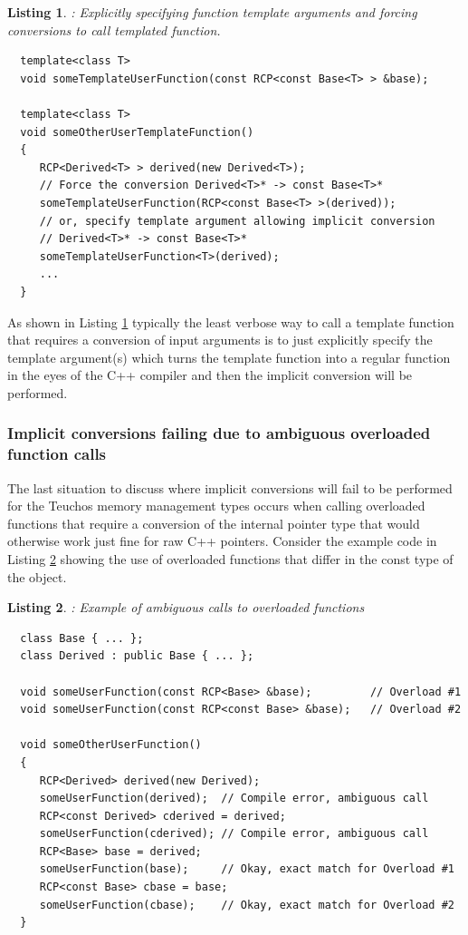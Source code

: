 \documentclass[pdf,ps2pdf,11pt]{SANDreport}
\newtheorem{listing}{Listing}
\begin{document}
{}\begin{listing}: Explicitly specifying function template arguments
and forcing conversions to call templated function.
\label{listing:implicit-conv-pass-explicit-template-func}
{\small\begin{verbatim}
  template<class T>
  void someTemplateUserFunction(const RCP<const Base<T> > &base);

  template<class T>
  void someOtherUserTemplateFunction()
  {
     RCP<Derived<T> > derived(new Derived<T>);
     // Force the conversion Derived<T>* -> const Base<T>*
     someTemplateUserFunction(RCP<const Base<T> >(derived));
     // or, specify template argument allowing implicit conversion
     // Derived<T>* -> const Base<T>*
     someTemplateUserFunction<T>(derived);
     ...
  }
\end{verbatim}}
\end{listing}


As shown in Listing
{}\ref{listing:implicit-conv-pass-explicit-template-func} typically
the least verbose way to call a template function that requires a
conversion of {} input arguments is to just explicitly
specify the template argument(s) which turns the template function
into a regular function in the eyes of the C++ compiler and then the
implicit conversion will be performed.


%
{}\subsubsection*{Implicit conversions failing due to ambiguous
overloaded function calls}
%

The last situation to discuss where implicit conversions will fail to
be performed for the Teuchos memory management types occurs when
calling overloaded functions that require a conversion of the internal
pointer type that would otherwise work just fine for raw C++ pointers.
Consider the example code in Listing
{}\ref{listing:overloaded-func-implicit-conv-problem} showing the use
of overloaded functions that differ in the const type of the object.


{}\begin{listing}: Example of ambiguous calls to overloaded functions
\label{listing:overloaded-func-implicit-conv-problem}
{\small\begin{verbatim}
  class Base { ... };
  class Derived : public Base { ... };

  void someUserFunction(const RCP<Base> &base);         // Overload #1
  void someUserFunction(const RCP<const Base> &base);   // Overload #2

  void someOtherUserFunction()
  {
     RCP<Derived> derived(new Derived);
     someUserFunction(derived);  // Compile error, ambiguous call
     RCP<const Derived> cderived = derived;
     someUserFunction(cderived); // Compile error, ambiguous call
     RCP<Base> base = derived;
     someUserFunction(base);     // Okay, exact match for Overload #1
     RCP<const Base> cbase = base;
     someUserFunction(cbase);    // Okay, exact match for Overload #2
  }
\end{verbatim}}
\end{listing}
\end{document}
